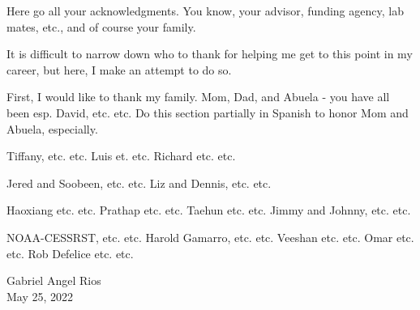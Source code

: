 Here go all your acknowledgments. You know, your advisor, funding agency, lab
mates, etc., and of course your family.

It is difficult to narrow down who to thank for helping me get to this point in my career, but here, I make an attempt to do so.

First, I would like to thank my family. Mom, Dad, and Abuela - you have all been esp. David, etc. etc. Do this section partially in Spanish to honor Mom and Abuela, especially.


Tiffany, etc. etc. Luis et. etc. Richard etc. etc.

Jered and Soobeen, etc. etc. Liz and Dennis, etc. etc.

Haoxiang etc. etc. Prathap etc. etc. Taehun etc. etc. Jimmy and Johnny, etc. etc.

NOAA-CESSRST, etc. etc. Harold Gamarro, etc. etc. Veeshan etc. etc. Omar etc. etc. Rob Defelice etc. etc.

\vskip 1in

\noindent
Gabriel Angel Rios\\
May 25, 2022
